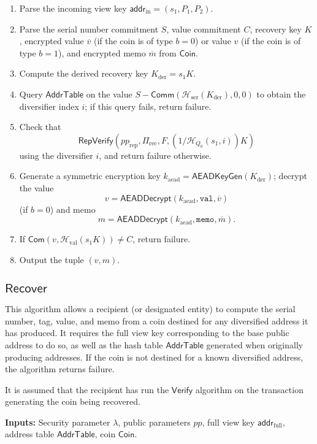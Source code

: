 \documentclass{llncs}
\newcommand{\hash}{\mathcal{H}}
\newcommand{\func}[1]{\mathsf{#1}}
\newcommand{\addr}{\func{addr}}
\newcommand{\com}{\func{Com}}
\newcommand{\comm}{\func{Comm}}
\begin{document}
\begin{enumerate}
\item Parse the incoming view key $\addr_{\text{in}} = (s_1, P_1, P_2)$.
\item Parse the serial number commitment $S$, value commitment $C$, recovery key $K$, encrypted value $\overline{v}$ (if the coin is of type $b=0$) or value $v$ (if the coin is of type $b=1$), and encrypted memo $\overline{m}$ from $\func{Coin}$.
\item Compute the derived recovery key $K_{\text{der}} = s_1 K$.
\item Query $\func{AddrTable}$ on the value $S - \comm(\hash_{\text{ser}}(K_{\text{der}}),0,0)$ to obtain the diversifier index $i$; if this query fails, return failure.
\item Check that $$\func{RepVerify}(pp_{\text{rep}},\Pi_{\text{rec}},F,(1/\hash_{Q_0}(s_1,i))K)$$ using the diversifier $i$, and return failure otherwise.
\item Generate a symmetric encryption key $k_{\text{aead}} = \func{AEADKeyGen}(K_{\text{der}})$; decrypt the value $$v = \func{AEADDecrypt}(k_{\text{aead}},\texttt{val},\overline{v})$$ (if $b=0$) and memo $$m = \func{AEADDecrypt}(k_{\text{aead}},\texttt{memo},\overline{m}).$$
\item If $\com(v,\hash_{\text{val}}(s_1 K)) \neq C$, return failure.
\item Output the tuple $(v, m)$.
\end{enumerate}


\subsection{\texorpdfstring{$\func{Recover}$}{Recover}}

This algorithm allows a recipient (or designated entity) to compute the serial number, tag, value, and memo from a coin destined for any diversified address it has produced.
It requires the full view key corresponding to the base public address to do so, as well as the hash table $\func{AddrTable}$ generated when originally producing addresses.
If the coin is not destined for a known diversified address, the algorithm returns failure.

It is assumed that the recipient has run the $\func{Verify}$ algorithm on the transaction generating the coin being recovered.

\textbf{Inputs:} Security parameter $\lambda$, public parameters $pp$, full view key $\addr_{\text{full}}$, address table $\func{AddrTable}$, coin $\func{Coin}$.
\end{document}
